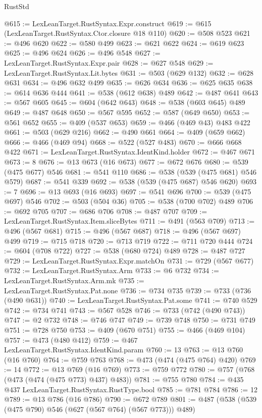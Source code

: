 \begin{lexlean}{RustStd}
\begin{coremodule}
{\begin{coremodule}
{{{{{{{{{{{@615 := LexLeanTarget.RustSyntax.Expr.construct
@619 := @615 (LexLeanTarget.RustSyntax.Ctor.closure @18 @110)
@620 := @508 @523
@621 := @496 @620
@622 := @580 @499
@623 := @621 @622
@624 := @619 @623
@625 := @496 @624
@626 := @496 @548
@627 := LexLeanTarget.RustSyntax.Expr.pair
@628 := @627 @548
@629 := LexLeanTarget.RustSyntax.Lit.bytes
@631 := @503 (@629 @132)
@632 := @628 @631
@634 := @496 @632 @499
@635 := @626 @634
@636 := @625 @635
@638 := @614 @636 @444
@641 := @538 (@612 @638) @489
@642 := @487 @641
@643 := @567 @605
@645 := @604 (@642 @643)
@648 := @538 (@603 @645) @489
@649 := @487 @648
@650 := @567 @595
@652 := @587 (@649 @650)
@653 := @561 @652
@655 := @409 (@537 @653)
@659 := @466 (@469 @43) @483 @422
@661 := @503 (@629 @216)
@662 := @490 @661
@664 := @409 (@659 @662)
@666 := @466 (@469 @94)
@668 := @522 (@527 @483)
@670 := @666 @668 @422
@671 := LexLeanTarget.RustSyntax.IdentKind.holder
@672 := @467 @671
@673 := 8
@676 := @13 @673 (@16 @673)
@677 := @672 @676
@680 := @539 (@475 @677) @546
@681 := @541 @110
@686 := @538 (@539 (@475 @681) @546 @579)
@687 := @541 @339
@692 := @538 (@539 (@475 @687) @546 @620)
@693 := 7
@696 := @13 @693 (@16 @693)
@697 := @541 @696
@700 := @539 (@475 @697) @546
@702 := @503 (@504 @36)
@705 := @538 (@700 @702) @489
@706 := @692 @705
@707 := @686 @706
@708 := @487 @707
@709 := LexLeanTarget.RustSyntax.Item.sliceBytes
@711 := @491 (@563 @709)
@713 := @496 (@567 @681)
@715 := @496 (@567 @687)
@718 := @496 (@567 @697) @499
@719 := @715 @718
@720 := @713 @719
@722 := @711 @720 @444
@724 := @604 (@708 @722)
@727 := @538 (@680 @724) @489
@728 := @487 @727
@729 := LexLeanTarget.RustSyntax.Expr.matchOn
@731 := @729 (@567 @677)
@732 := LexLeanTarget.RustSyntax.Arm
@733 := @6 @732
@734 := LexLeanTarget.RustSyntax.Arm.mk
@735 := LexLeanTarget.RustSyntax.Pat.none
@736 := @734 @735
@739 := @733 (@736 (@490 @631))
@740 := LexLeanTarget.RustSyntax.Pat.some
@741 := @740 @529
@742 := @734 @741
@743 := @567 @528
@746 := @733 (@742 (@490 @743))
@747 := @2 @732
@748 := @746 @747
@749 := @739 @748
@750 := @731 @749
@751 := @728 @750
@753 := @409 (@670 @751)
@755 := @466 (@469 @104)
@757 := @473 (@480 @412)
@759 := @467 LexLeanTarget.RustSyntax.IdentKind.param
@760 := 13
@763 := @13 @760 (@16 @760)
@764 := @759 @763
@768 := @473 (@474 (@475 @764) @420)
@769 := 14
@772 := @13 @769 (@16 @769)
@773 := @759 @772
@780 := @757 (@768 (@473 (@474 (@475 @773) @437) @483))
@781 := @755 @780
@784 := @435 @437 LexLeanTarget.RustSyntax.RustType.bool
@785 := @781 @784
@786 := 12
@789 := @13 @786 (@16 @786)
@790 := @672 @789
@801 := @487 (@538 (@539 (@475 @790) @546 (@627 (@567 @764) (@567 @773))) @489)
}}}}}}}}}}}
\end{coremodule}}
\end{coremodule}
\end{lexlean}
